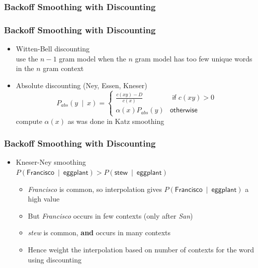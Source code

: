 \documentclass{beamer}
\begin{document}
\subsubsection{Backoff Smoothing with Discounting}

\begin{frame}
\frametitle{Backoff Smoothing with Discounting}
\begin{itemize}[<+->]
\item Witten-Bell discounting \\
use the $n-1$ gram model when the $n$ gram model has too few unique words \alert{in the $n$ gram context}
\item Absolute discounting (Ney, Essen, Kneser)
\[ P_{\textit{abs}}(y~\mid~x) = \left\{ 
\begin{array}{cc}
\frac{ c(xy) - D }{ c(x) } & \textsf{ if $c(xy) > 0$} \\
\alpha(x) P_{\textit{abs}} (y) & \textsf{otherwise}
\end{array}
\right. \]
compute $\alpha(x)$ as was done in Katz smoothing
\end{itemize}
\end{frame}

\begin{frame}
\frametitle{Backoff Smoothing with Discounting}
\begin{itemize}[<+->]
\item Kneser-Ney smoothing \\
$P(\textsf{Francisco}~\mid~\textsf{eggplant}) > P(\textsf{stew}~\mid~\textsf{eggplant})$
\begin{itemize}[<+->]
\item {\em Francisco} is common, so interpolation gives $P(\textsf{Francisco}~\mid~\textsf{eggplant})$ a high value
\item But {\em Francisco} occurs in few contexts (only after {\em San})
\item {\em stew} is common, {\bf and} occurs in many contexts
\item Hence weight the interpolation based on number of contexts for the word using discounting
\end{itemize}
\end{itemize}
\end{frame}

\end{document}
